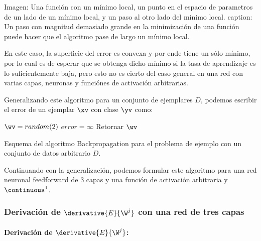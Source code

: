 Imagen: Una función con un mínimo local, un punto en el espacio de parametros de un lado de un mínimo local, y un paso al otro lado del mínimo local.
caption: Un paso con magnitud demasiado grande en la minimización de una función puede hacer que el algoritmo pase de largo un mínimo local.

En este caso, la superficie del error es convexa y por ende tiene un sólo mínimo, por lo cual es de esperar que se obtenga dicho mínimo si la tasa de aprendizaje es lo suficientemente baja, pero esto no es cierto del caso general en una red con varias capas, neuronas y funciónes de activación arbitrarias. 

Generalizando este algoritmo para un conjunto de ejemplares $D$, podemos escribir el error de un ejemplar $\xv$ con clase $\yv$ como:


\begin{algorithm}[H]
$\wv=random(2)$\;
$error=\infty$ \;
Retornar  $\wv$ \;
\caption{Esquema del algoritmo Backpropagation para el problema de ejemplo con un conjunto de datos arbitrario $D$.} 
\end{algorithm}

Continuando con la generalización, podemos formular este algoritmo para una red neuronal feedforward de $3$ capas y una función de activación arbitraria y $\continuous^1$.


\subsubsection{Derivación de $\derivative{E}{\W^j}$ con una red de tres capas} 

\paragraph{Derivación de $\derivative{E}{\W^j}$:}

